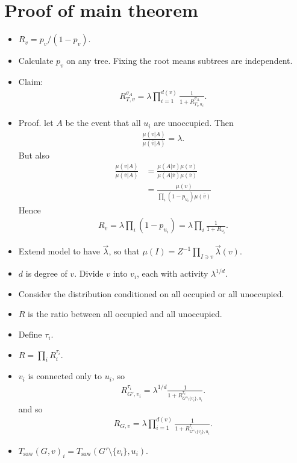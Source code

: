 \documentclass[11pt]{article} \usepackage{amssymb}
\newcommand{\act}{\lambda}
\newcommand{\saw}{\mathrm{saw}}
\begin{document}
\section{Proof of main theorem}
\begin{itemize}

\item $R_v=p_v/(1-p_v)$.

\item Calculate $p_v$ on any tree. Fixing the root means subtrees are
  independent.

\item Claim:
  \begin{align*}
    R_{T,v}^{\sigma_\Lambda}=\act\prod_{i=1}^{d(v)}\frac{1}{1+R_{T_i,u_i}^{\sigma_{\Lambda_i}}}.
  \end{align*}
\item Proof. let $A$ be the event that all $u_i$ are unoccupied. Then
  \begin{align*}
    \frac{\mu(v|A)}{\mu(\bar{v}|A)} = \act.
  \end{align*}
  But also
  \begin{align*}
    \frac{\mu(v|A)}{\mu(\bar{v}|A)} &=
    \frac{\mu(A|v)\mu(v)}{\mu(A|\bar{v})\mu(\bar{v})} \\
    &= \frac{\mu(v)}{\prod_i(1-p_{u_i})\mu(\bar{v})}
  \end{align*}
  Hence
  \begin{align*}
    R_v = \act\prod_i(1-p_{u_i})=\act\prod_i\frac{1}{1+R_{u_i}}.
  \end{align*}
  
\item Extend model to have $\vec{\act}$, so that $\mu(I) =
  Z^{-1}\prod_{I \ni v}\vec{\act}(v)$.

\item $d$ is degree of $v$. Divide $v$ into $v_i$, each with activity
  $\act^{1/d}$.
\item Consider the distribution conditioned on all occupied or all
  unoccupied.
\item $R$ is the ratio between all occupied and all unoccupied.
\item Define $\tau_i$.
\item $R = \prod_iR_i^{\tau_i}$.
\item $v_i$ is connected only to $u_i$, so 
  \begin{align*}
    R_{G',v_i}^{\tau_i}=\act^{1/d}\frac{1}{1+R_{G'\setminus\{v_i\},u_i}^{\tau_i}}.
  \end{align*}
  and so 
  \begin{align*}
    R_{G,v}^{}=\act\prod_{i=1}^{d(v)}\frac{1}{1+R_{G'\setminus\{v_i\},u_i}^{\tau_i}}.
  \end{align*}

\item $T_\saw(G,v)_i = T_\saw(G' \setminus \{v_i\}, u_i)$.
\end{itemize}
\end{document}
